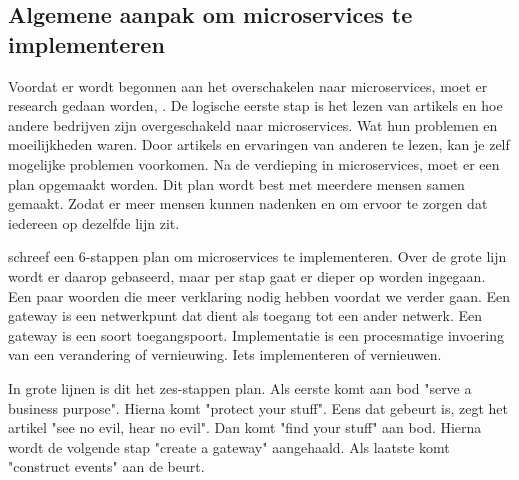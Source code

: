 \subsection{Algemene aanpak om microservices te implementeren}
Voordat er wordt begonnen aan het overschakelen naar microservices, moet er research gedaan worden, \textcite{Koukia2018}. De logische eerste stap is het lezen van artikels en hoe andere bedrijven zijn overgeschakeld naar microservices. Wat hun problemen en moeilijkheden waren. Door artikels en ervaringen van anderen te lezen, kan je zelf mogelijke problemen voorkomen. Na de verdieping in microservices, moet er een plan opgemaakt worden. Dit plan wordt best met meerdere mensen samen gemaakt. Zodat er meer mensen kunnen nadenken en om ervoor te zorgen dat iedereen op dezelfde lijn zit.


\textcite{Benetis2016} schreef een 6-stappen plan om microservices te implementeren. Over de grote lijn wordt er daarop gebaseerd, maar per stap gaat er dieper op worden ingegaan.
Een paar woorden die meer verklaring nodig hebben voordat we verder gaan. Een gateway is een netwerkpunt dat dient als toegang tot een ander netwerk. Een gateway is een soort toegangspoort. 
Implementatie is een procesmatige invoering van een verandering of vernieuwing. Iets implementeren of vernieuwen. 

In grote lijnen is dit het zes-stappen plan. Als eerste komt aan bod "serve a business purpose". Hierna komt "protect your stuff". Eens dat gebeurt is, zegt het artikel "see no evil, hear no evil". Dan komt "find your stuff" aan bod. Hierna wordt de volgende stap "create a gateway" aangehaald. Als laatste komt "construct events" aan de beurt.

